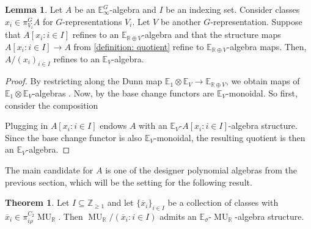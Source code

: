 \documentclass[a4paper, 10pt]{article}
\makeatletter
\newcommand{\E}{\mathbb E}  %
\newcommand{\R}{\mathbb R}
\newcommand{\Z}{\mathbb{Z}}
\newcommand{\MU}{\operatorname{MU}}
\newcommand{\MUR}{{\MU_{\mathbb{R}}}}
\newcommand{\Alg}{\mathrm{Alg}}
\newcommand{\LMod}{\mathrm{LMod}}
\newcommand{\Res}{\operatorname{Res}}
\DeclareRobustCommand{\myuline}[2][0pt]{%
  \ifmmode
    \uline{\hphantom{#2}\kern-#1}%
    \kern#1%
    \mathllap{\mathpalette\my@cont@{#2}}%
  \else
    \uline{\phantom{#2}\kern-#1}%
    \kern#1%
    \llap{\contour{white}{#2}}%
  \fi
}
\newcommand{\ul}{\myuline}
\newcommand{\my@cont@}[2]{\contour{white}{\mbox{$\m@th#1#2$}}}
\theoremstyle{definition}
\newtheorem{lemma}[lemma]{Lemma}
\newtheorem{theorem}[theorem]{Theorem}
\makeatother
\begin{document}
\begin{lemma} \label{lemma: enhance structure of quotients}
    Let $A$ be an $\E_{\infty}^G$-algebra and $I$ be an indexing set. Consider classes $x_i \in \pi_{V_i}^G A$ for $G$-representations $V_i$. Let $V$ be another $G$-representation. Suppose that $A[x_i : i \in I]$ refines to an $\E_{\R \oplus V}$-algebra and that the structure maps $A[x_i : i \in I] \to A$ from \cref{definition: quotient} refine to $\E_{\R \oplus V}$-algebra maps. Then, $A/(x_i)_{i \in I}$ refines to an $\E_V$-algebra.
\end{lemma}

\begin{proof}
    By restricting along the Dunn map $\E_1 \otimes \E_V \to \E_{\R \oplus V}$, we obtain maps of $\E_1 \otimes \E_V$-algebras \cite[Theorem III.2.2]{StewartDunn}.
    Now, by \cite[Corollary 3.3.9]{quinnZhu2026multiplicativeequivariantthomspectra} the base change functors are $\E_V$-monoidal. So first, consider the composition
    \begin{center}
    \end{center}
    Plugging in $A[x_i:i \in I]$ endows $A$ with an $\E_V$-$A[x_i:i \in I]$-algebra structure. Since the base change functor is also $\E_V$-monoidal, the resulting quotient is then an $\E_V$-algebra.
\end{proof}

The main candidate for $A$ is one of the designer polynomial algebras from the previous section, which will be the setting for the following result.

\begin{theorem}\label{thm:MUR_quotients}
    Let \(I\subseteq \Z_{\geq 1}\) and let \(\{\overline{x}_{i}\}_{i\in I}\) be a collection of classes with  \(\overline{x}_i\in \pi^{C_2}_{i\rho}\MUR\).
    Then \(\MUR/(\overline{x}_i:i\in I)\) admits an \(\E_\sigma\)-\(\MUR\)-algebra structure.
\end{theorem}
\end{document}
